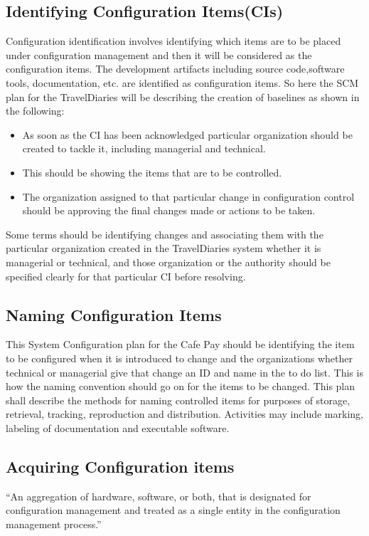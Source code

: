 \documentclass[]{article}
\begin{document}
\subsection{Identifying Configuration Items(CIs)}
Configuration identification involves identifying which items are to be placed under configuration management and then it will be considered as the configuration items. The
development artifacts including source code,software tools, documentation, etc. are identified as configuration items. So here the SCM plan for the TravelDiaries will be describing the creation of baselines as shown in the following:


\begin{itemize}

\item As soon as the CI has been acknowledged particular organization should be created to tackle it, including managerial and technical.
\item This should be showing the items that are to be controlled.
\item The organization assigned to that particular change in configuration control should be approving the final changes made or actions to be taken.

\end{itemize}
Some terms should be identifying changes and associating them with the particular organization created in the TravelDiaries system whether it is managerial or technical, and those organization or the authority should be specified clearly for that particular CI before resolving.
 

\subsection{Naming Configuration Items}
This System Configuration plan for the Cafe Pay should be identifying the item to be configured when it is introduced to change and the organizations whether technical or managerial give that change an ID and name in the to do list. This is how the naming convention should go on for the items to be changed. This plan shall describe the methods for naming controlled items for purposes of storage, retrieval, tracking, reproduction and distribution. Activities may include marking, labeling of documentation and executable software.

\subsection{Acquiring Configuration items}
“An aggregation of hardware, software, or both, that is
designated for configuration management and treated as a
single entity in the configuration management process.”\\
\end{document}
